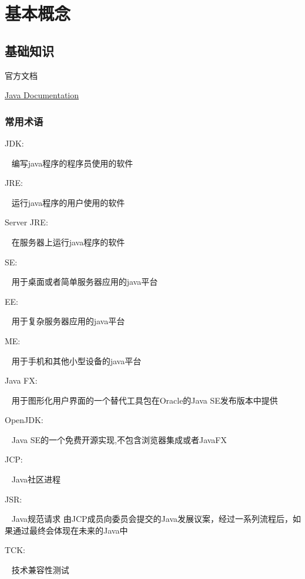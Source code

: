 \chapter{基本概念}
\label{chap:base}

\section{基础知识}

官方文档   

\href{https://docs.oracle.com/en/java/}{Java Documentation}
\newline

\subsection{常用术语}

JDK:    \par
~ 编写java程序的程序员使用的软件

JRE:    \par
~ 运行java程序的用户使用的软件

Server JRE:  \par
~ 在服务器上运行java程序的软件

SE:    \par
~ 用于桌面或者简单服务器应用的java平台

EE:    \par
~ 用于复杂服务器应用的java平台 

ME:   \par
~ 用于手机和其他小型设备的java平台  

Java FX:  \par
~ 用于图形化用户界面的一个替代工具包在Oracle的Java SE发布版本中提供

OpenJDK:  \par
~ Java SE的一个免费开源实现,不包含浏览器集成或者JavaFX 

JCP:    \par
~ Java社区进程

JSR:    \par
~ Java规范请求 由JCP成员向委员会提交的Java发展议案，经过一系列流程后，如果通过最终会体现在未来的Java中

TCK:    \par
~ 技术兼容性测试

